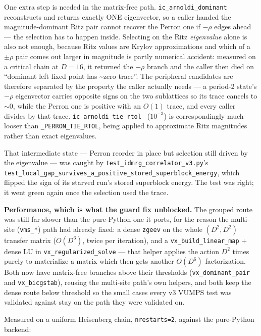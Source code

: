 \documentclass[11pt]{article}
\begin{document}
One extra step is needed in the matrix-free path.
\texttt{ic\_arnoldi\_dominant} reconstructs and returns exactly ONE
eigenvector, so a caller handed the magnitude-dominant Ritz pair cannot
recover the Perron one if $-\rho$ edges ahead --- the selection has to happen
inside. Selecting on the Ritz \emph{eigenvalue} alone is also not enough,
because Ritz values are Krylov approximations and which of a $\pm\rho$ pair
comes out larger in magnitude is partly numerical accident: measured on a
critical chain at $D=16$, it returned the $-\rho$ branch and the caller then
died on ``dominant left fixed point has \textasciitilde zero trace''. The
peripheral candidates are therefore separated by the property the caller
actually needs --- a period-2 state's $-\rho$ eigenvector carries opposite
signs on the two sublattices so its trace cancels to ${\sim}0$, while the
Perron one is positive with an $O(1)$ trace, and every caller divides by that
trace. \texttt{ic\_arnoldi\_tie\_rtol\_} ($10^{-3}$) is correspondingly much
looser than \texttt{\_PERRON\_TIE\_RTOL}, being applied to approximate Ritz
magnitudes rather than exact eigenvalues.

That intermediate state --- Perron reorder in place but selection still
driven by the eigenvalue --- was caught by
\texttt{test\_idmrg\_correlator\_v3.py}'s
\texttt{test\_local\_gap\_survives\_a\_positive\_stored\_superblock\_energy},
which flipped the sign of its starved run's stored superblock energy. The
test was right; it went green again once the selection used the trace.

\textbf{Performance, which is what the guard fix unblocked.} The grouped
route was still far slower than the pure-Python one it ports, for the reason
the multi-site (\texttt{vms\_*}) path had already fixed: a dense
\texttt{zgeev} on the whole $(D^2,D^2)$ transfer matrix ($O(D^6)$, twice per
iteration), and a \texttt{vx\_build\_linear\_map} + dense LU in
\texttt{vx\_regularized\_solve} --- that helper applies the action $D^2$
times purely to materialize a matrix which then gets another $O(D^6)$
factorization. Both now have matrix-free branches above their thresholds
(\texttt{vx\_dominant\_pair} and \texttt{vx\_bicgstab}), reusing the
multi-site path's own helpers, and both keep the dense route below threshold
so the small cases every v3 VUMPS test was validated against stay on the path
they were validated on.

Measured on a uniform Heisenberg chain, \texttt{nrestarts=2}, against the
pure-Python backend:
\end{document}
